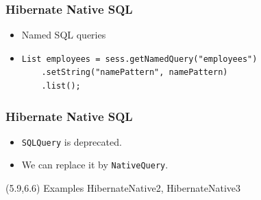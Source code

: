 \documentclass[10pt,xcolor=pdflatex]{beamer}
\begin{document}
\begin{frame}[fragile]\frametitle{Hibernate Native SQL}
	\begin{itemize}
        \item Named SQL queries
        \item[]
        	\footnotesize
            \lstset{language=Java}
            \begin{lstlisting}   
List employees = sess.getNamedQuery("employees")
    .setString("namePattern", namePattern)
    .list();            
			\end{lstlisting}  
            \normalsize        
	\end{itemize}
\end{frame}

\begin{frame}[fragile]\frametitle{Hibernate Native SQL}
  \begin{itemize}
    \item \texttt{SQLQuery} is deprecated.
    \item We can replace it by \texttt{NativeQuery}.
  \end{itemize}
\begin{textblock}{15}(5.9,6.6)
    {\footnotesize Examples HibernateNative2, HibernateNative3}
\end{textblock}
\end{frame}
\end{document}
